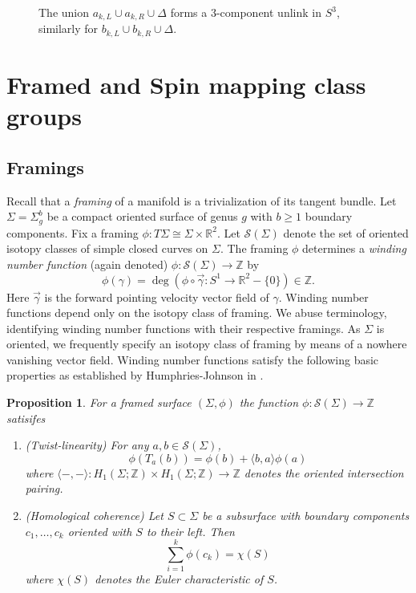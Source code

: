 \documentclass[10pt]{amsart}
\numberwithin{equation}{section}
\theoremstyle{plain}
\newtheorem{proposition}[theorem]{Proposition}
\theoremstyle{definition}
\theoremstyle{remark}
\begin{document}
\begin{figure}
  \centering
  \def\svgwidth{0.85\columnwidth}
  
  \caption{\textnormal{The union $a_{k,L}\cup a_{k,R} \cup \Delta$ forms a 3-component unlink in $S^3$, similarly for $b_{k,L} \cup b_{k,R} \cup \Delta$}.}
  \label{pantsrelbdry}
\end{figure}








\section{Framed and Spin mapping class groups}


\subsection{Framings} Recall that a \textit{framing} of a manifold is a trivialization of its tangent bundle. Let $\Sigma = \Sigma_g^b$ be a compact oriented surface of genus $g$ with $b \geq 1$ boundary components. Fix a framing $\phi : T\Sigma \cong \Sigma \times \mathbb{R}^2$. Let $\mathcal{S}(\Sigma)$ denote the set of oriented isotopy classes of simple closed curves on $\Sigma$. The framing $\phi$ determines a \textit{winding number function} (again denoted) $\phi : \mathcal{S}(\Sigma) \to \mathbb{Z}$  by \[\phi(\gamma) = \deg(\phi \circ \overrightarrow{\gamma} : S^1 \to \mathbb{R}^2 -\{0\}) \in \mathbb{Z}.\]  Here $\overrightarrow{\gamma}$ is the forward pointing velocity vector field of $\gamma$. Winding number functions depend only on the isotopy class of framing. We abuse terminology, identifying winding number functions with their respective framings. As $\Sigma$ is oriented, we frequently specify an isotopy class of framing by means of a nowhere vanishing vector field. Winding number functions satisfy the following basic properties as established by Humphries-Johnson in \cite{HJ}. 


\begin{proposition}
\label{twistlinear}
For a framed surface $(\Sigma,\phi)$ the function $\phi : \mathcal{S}(\Sigma) \to \mathbb{Z}$ satisifes  
\begin{enumerate}
    \item (Twist-linearity) For any $a,b \in \mathcal{S}(\Sigma)$, 
    $$ \phi(T_a(b)) = \phi(b) + \langle b,a\rangle \phi(a)$$
    where $\langle -,-\rangle : H_1(\Sigma;\mathbb{Z}) \times H_1(\Sigma;\mathbb{Z}) \to \mathbb{Z}$ denotes the oriented intersection pairing. 
    \item (Homological coherence) Let $S \subset \Sigma$ be a subsurface with boundary components $c_1,\ldots,c_k$ oriented with $S$ to their left. Then 
    $$\sum_{i=1}^k \phi(c_k) = \chi(S)$$
    where $\chi(S)$ denotes the Euler characteristic of $S$. 
\end{enumerate}


\end{proposition}
\end{document}
